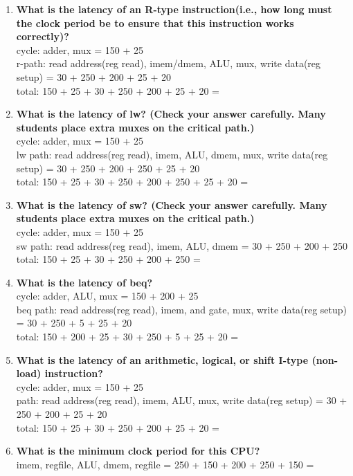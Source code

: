 \documentclass{article}
\begin{document}
    \begin{enumerate}[label=(\alph*)]
        \item \textbf{What is the latency of an R-type instruction(i.e., how long must the clock period be to ensure that this instruction works correctly)?}
        \\
        cycle: adder, mux = 150 + 25\\
        r-path: read address(reg read), imem/dmem, ALU, mux, write data(reg setup) = 30 + 250 + 200 + 25 + 20\\
        total: 150 + 25 + 30 + 250 + 200 + 25 + 20 = 
        \item \textbf{What is the latency of lw? (Check your answer carefully. Many students place extra muxes on the critical path.)}
        \\
        cycle: adder, mux = 150 + 25\\
        lw path: read address(reg read), imem, ALU, dmem, mux, write data(reg setup) = 30 + 250 + 200 + 250 + 25 + 20\\
        total: 150 + 25 + 30 + 250 + 200 + 250 + 25 + 20 = 
        \item \textbf{What is the latency of sw? (Check your answer carefully. Many students place extra muxes on the critical path.)}
        \\
        cycle: adder, mux = 150 + 25\\
        sw path: read address(reg read), imem, ALU, dmem = 30 + 250 + 200 + 250\\
        total: 150 + 25 + 30 + 250 + 200 + 250 = \\
        \item \textbf{What is the latency of beq?}
        \\
        cycle: adder, ALU, mux = 150 + 200 + 25\\
        beq path: read address(reg read), imem, and gate, mux, write data(reg setup) = 30 + 250 + 5 + 25 + 20\\
        total: 150 + 200 + 25 + 30 + 250 + 5 + 25 + 20 = 
        \item \textbf{What is the latency of an arithmetic, logical, or shift I-type (non-load) instruction?}
        \\
        cycle: adder, mux = 150 + 25\\
        path: read address(reg read), imem, ALU, mux, write data(reg setup) = 30 + 250 + 200 + 25 + 20\\
        total: 150 + 25 + 30 + 250 + 200 + 25 + 20 = \\
        \item \textbf{What is the minimum clock period for this CPU?}
        \\
        imem, regfile, ALU, dmem, regfile = 250 + 150 + 200 + 250 + 150 = 
    \end{enumerate}
\end{document}
